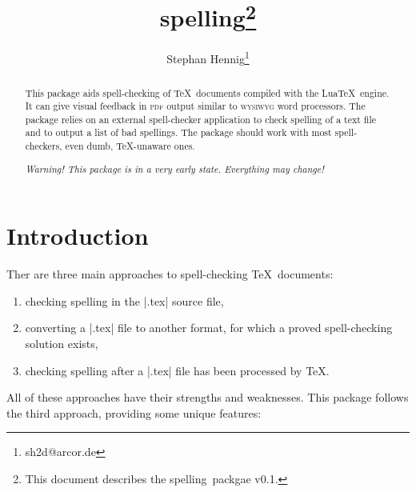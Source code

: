 \documentclass[11pt]{article}
\newcommand*{\pkg}{\textsf{spelling}}
\newcommand*{\acr}[1]{\mbox{\scshape#1}}
\begin{document}
\author{Stephan Hennig\thanks{sh2d@arcor.de}}
\title{\pkg\thanks{This document describes the \pkg\ packgae v0.1.}}
\maketitle


\begin{abstract}
  This package aids spell-checking of \TeX\ documents compiled with the
  Lua\TeX\ engine.  It can give visual feedback in \acr{pdf} output
  similar to \acr{wysiwyg} word processors.  The package relies on an
  external spell-checker application to check spelling of a text file
  and to output a list of bad spellings.  The package should work with
  most spell-checkers, even dumb, \TeX-unaware ones.

  \emph{Warning!  This package is in a very early state.  Everything may
    change!}
\end{abstract}

\begin{multicols}{2}
\small
\makeatletter
\renewcommand{\@tocrmarg}{2.55em plus1fil}
\makeatother
\tableofcontents
\end{multicols}


\section{Introduction}
\label{sec:intro}

Ther are three main approaches to spell-checking \TeX\ documents:

\begin{enumerate}

\item checking spelling in the |.tex| source file,

\item converting a |.tex| file to another format, for which a proved
  spell-checking solution exists,

\item checking spelling after a |.tex| file has been processed by \TeX.

\end{enumerate}

All of these approaches have their strengths and weaknesses.  This
package follows the third approach, providing some unique features:
\end{document}
